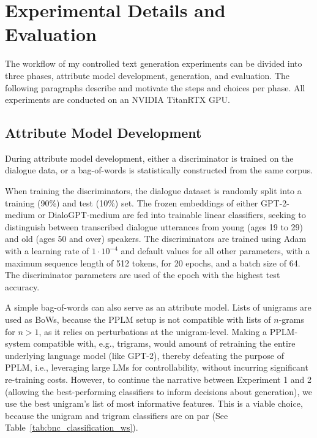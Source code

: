 \section{Experimental Details and Evaluation}


The workflow of my controlled text generation experiments can be divided into three phases, attribute model development, generation, and evaluation. The following paragraphs describe and motivate the steps and choices per phase. All experiments are conducted on an NVIDIA TitanRTX GPU.

\subsection{Attribute Model Development}
\label{subsec:att_model_dev}
During attribute model development, either a discriminator is trained on the dialogue data, or a bag-of-words is statistically constructed from the same corpus.

When training the discriminators, the dialogue dataset is randomly split into a training (90\%) and test (10\%) set. The frozen embeddings of either GPT-2-medium \citep{radford2019language} or DialoGPT-medium \citep{zhang2019dialogpt} are fed into trainable linear classifiers, seeking to distinguish between transcribed dialogue utterances from young (ages 19 to 29) and old (ages 50 and over) speakers. The discriminators are trained using Adam \citep{DBLP:journals/corr/KingmaB14} with a learning rate of $1\cdot10^{-4}$ and default values for all other parameters, with a maximum sequence length of 512 tokens, for 20 epochs, and a batch size of 64. The discriminator parameters are used of the epoch with the highest test accuracy.

A simple bag-of-words can also serve as an attribute model. Lists of unigrams are used as BoWs, because the PPLM setup is not compatible with lists of $n$-grams for $n > 1$, as it relies on perturbations at the unigram-level. Making a PPLM-system compatible with, e.g., trigrams, would amount of retraining the entire underlying language model (like GPT-2), thereby defeating the purpose of PPLM, i.e., leveraging large LMs for controllability, without incurring significant re-training costs. However, to continue the narrative between Experiment 1 and 2 (allowing the best-performing classifiers to inform decisions about generation), we use the best unigram's list of most informative features. This is a viable choice, because the unigram and trigram classifiers are on par (See Table~\ref{tab:bnc_classification_ws}).



